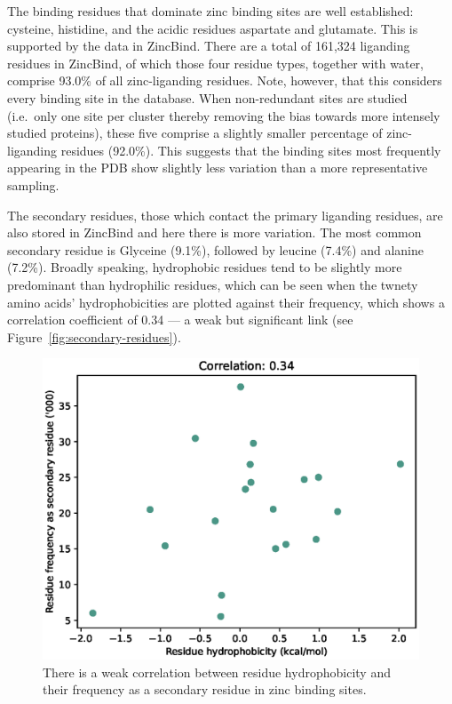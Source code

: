The binding residues that dominate zinc binding sites are well established: cysteine, histidine, and the acidic residues aspartate and glutamate. This is supported by the data in ZincBind. There are a total of 161,324 liganding residues in ZincBind, of which those four residue types, together with water, comprise 93.0\% of all zinc-liganding residues. Note, however, that this considers every binding site in the database. When non-redundant sites are studied (i.e.\ only one site per cluster thereby removing the bias towards more intensely studied proteins), these five comprise a slightly smaller percentage of zinc-liganding residues (92.0\%). This suggests that the binding sites most frequently appearing in the PDB show slightly less variation than a more representative sampling.

The secondary residues, those which contact the primary liganding residues, are also stored in ZincBind and here there is more variation. The most common secondary residue is Glyceine (9.1\%), followed by leucine (7.4\%) and alanine (7.2\%). Broadly speaking, hydrophobic residues tend to be slightly more predominant than hydrophilic residues, which can be seen when the twnety amino acids' hydrophobicities are plotted against their frequency, which shows a correlation coefficient of 0.34 --- a weak but significant link (see Figure~\ref{fig:secondary-residues}).

\begin{figure}
\centering
\includegraphics[width=1.0\textwidth]{Figures/secondary-residues.eps}
\caption[Correlation between residue hydrophobicity and their frequency as a secondary residue in zinc binding sites]{\label{fig:secondary-residues.eps} There is a weak correlation between residue hydrophobicity and their frequency as a secondary residue in zinc binding sites.}
\end{figure}

